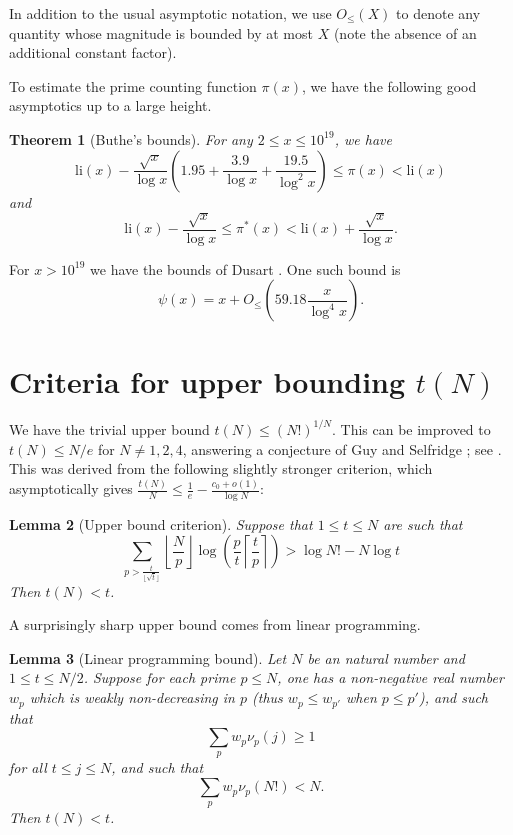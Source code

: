 \documentclass[12pt,a4paper,reqno]{amsart}
\numberwithin{equation}{section}
\theoremstyle{plain}
\newtheorem{theorem}{Theorem}[section]
\newtheorem{lemma}[theorem]{Lemma}
\theoremstyle{definition}
\begin{document}
In addition to the usual asymptotic notation, we use $O_{\leq}(X)$ to denote any quantity whose magnitude is bounded by at most $X$ (note the absence of an additional constant factor).

To estimate the prime counting function $\pi(x)$, we have the following good asymptotics up to a large height.

  \begin{theorem}[Buthe's bounds]\cite{buthe}  For any $2 \leq x \leq 10^{19}$, we have
  $$ \mathrm{li}(x) - \frac{\sqrt{x}}{\log x}\left(1.95 + \frac{3.9}{\log x} + \frac{19.5}{\log^2 x}\right) \leq \pi(x) < \mathrm{li}(x)$$
  and
  $$ \mathrm{li}(x) - \frac{\sqrt{x}}{\log x} \leq \pi^*(x) < \mathrm{li}(x) + \frac{\sqrt{x}}{{\log x}}.$$
  \end{theorem}
  
  For $x > 10^{19}$ we have the bounds of Dusart \cite{dusart}.  One such bound is
  $$ \psi(x) = x + O_{\leq}\left(59.18 \frac{x}{\log^4 x}\right).$$

  
\section{Criteria for upper bounding \texorpdfstring{$t(N)$}{t(N)}}

We have the trivial upper bound $t(N) \leq (N!)^{1/N}$.  This can be improved to $t(N) \leq N/e$ for $N \neq 1,2,4$, answering a conjecture of Guy and Selfridge \cite{guy-selfridge}; see \cite{tao}.  This was derived from the following slightly stronger criterion, which asymptotically gives $\frac{t(N)}{N} \leq \frac{1}{e} - \frac{c_0+o(1)}{\log N}$:

\begin{lemma}[Upper bound criterion]\label{upper-crit}  \cite[Lemma 2.1]{tao} Suppose that $1 \leq t \leq N$ are such that
  \begin{equation}\label{contra}
     \sum_{p > \frac{t}{\lfloor\sqrt{t}\rfloor}} \left\lfloor \frac{N}{p} \right\rfloor \log \left( \frac{p}{t} \left\lceil \frac{t}{p} \right\rceil \right) > \log N! - N \log t
  \end{equation}
  Then $t(N) < t$.
  \end{lemma}

A surprisingly sharp upper bound comes from linear programming.

\begin{lemma}[Linear programming bound]\label{lp-upper}  Let $N$ be an natural number and $1 \leq t \leq N/2$.  Suppose for each prime $p \leq N$, one has a non-negative real number $w_p$ which is weakly non-decreasing in $p$ (thus $w_p \leq w_{p'}$ when $p \leq p'$), and such that
\begin{equation}\label{pj}
 \sum_p w_p \nu_p(j) \geq 1
\end{equation}
for all $t \leq j \leq N$, and such that
\begin{equation}\label{hyp}
\sum_p w_p \nu_p(N!) < N.
\end{equation}
Then $t(N) < t$.
\end{lemma}
\end{document}
